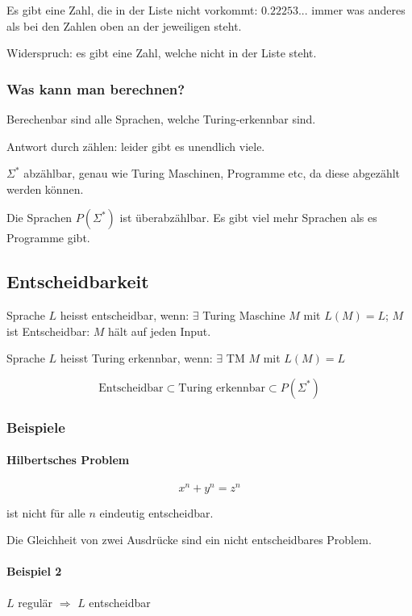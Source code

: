Es gibt eine Zahl, die in der Liste nicht vorkommt: $0.22253...$ immer was anderes als bei den Zahlen oben an der jeweiligen steht.

Widerspruch: es gibt eine Zahl, welche nicht in der Liste steht.


\subsubsection{Was kann man berechnen?}

Berechenbar sind alle Sprachen, welche Turing-erkennbar sind.

Antwort durch zählen: leider gibt es unendlich viele. 

$\Sigma^\ast$ abzählbar, genau wie Turing Maschinen, Programme etc, da diese abgezählt werden können.

Die Sprachen $P(\Sigma^\ast)$ ist überabzählbar. Es gibt viel mehr Sprachen als es Programme gibt.

\subsection{Entscheidbarkeit}

Sprache $L$ heisst entscheidbar, wenn: $\exists$ Turing Maschine $M$ mit $L(M) = L$; $M$ ist Entscheidbar: $M$ hält auf jeden Input.

Sprache $L$ heisst Turing erkennbar, wenn: $\exists$ TM $M$ mit $L(M)=L$

\[
	\text{Entscheidbar} \subset \text{Turing erkennbar} \subset P(\Sigma^\ast)
\]


\subsubsection{Beispiele}
	
	
\paragraph{Hilbertsches Problem}
\[
	x^n + y^n = z^n
\]

ist nicht für alle $n$ eindeutig entscheidbar.

Die Gleichheit von zwei Ausdrücke sind ein nicht entscheidbares Problem.

 \paragraph{Beispiel 2}
 
 $L$ regulär $\Rightarrow$ $L$ entscheidbar
 
